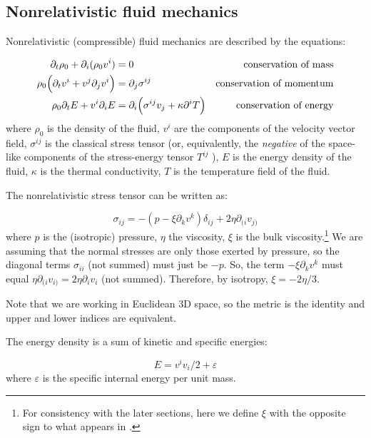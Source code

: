 \documentclass[main.tex]{subfiles}
\begin{document}
\subsection{Nonrelativistic fluid mechanics} \label{sec:nonrelativisti-fluid-mechanics}

Nonrelativistic (compressible) fluid mechanics are described by the equations:

\begin{subequations}
\begin{align}
    \partial_t \rho_0 + \partial_i (\rho_0 v^i) &= 0 &\text{conservation of mass} \\
    \rho_0 \qty(\partial_t v^i + v^j \partial_j v^i) &= \partial_j \sigma^{ij} &\text{conservation of momentum}  \\
    \rho_0 \partial_t E + v^i \partial_i E &= \partial_i \qty(\sigma^{ij}v_j + \kappa\partial^i T) &\text{conservation of energy}
\end{align}
\end{subequations}
where $\rho_0$ is the density of the fluid,
$v^i$ are the components of the velocity vector field,
$\sigma^{ij}$ is the classical stress tensor (or, equivalently, the \emph{negative} of the  space-like components of the stress-energy tensor \(T^{ij}\) ),
$E$ is the energy density of the fluid,
$\kappa$ is the thermal conductivity,
$T$ is the temperature  field of the fluid.

The nonrelativistic stress tensor can be written as:

\begin{equation}
    \sigma_{ij} = -(p - \xi \partial_k v^k ) \delta_{ij} + 2 \eta \partial_{(i} v_{j)}
\end{equation}
where $p$ is the (isotropic) pressure, $\eta$ the viscosity, $\xi$ is the bulk viscosity.\footnote{For consistency with the later sections, here we define \(\xi\) with the opposite sign to what appears in \cite[page 301]{Taub:1978}.} We are assuming that the normal stresses are only those exerted by pressure, so the diagonal terms $\sigma_{ii}$ (not summed) must just be $-p$. So, the term $-\xi \partial_k v^k$ must equal $\eta \partial_{(i} v_{i)} = 2\eta \partial_i v_i$ (not summed). Therefore, by isotropy, $\xi = -2\eta/3$.

Note that we are working in Euclidean 3D space, so the metric is the identity and upper and lower indices are equivalent.

The energy density is a sum of kinetic and specific energies:

\begin{equation}
    E = v^i v_i /2 + \varepsilon
\end{equation}
where $\varepsilon$ is the specific internal energy per unit mass.
\end{document}
